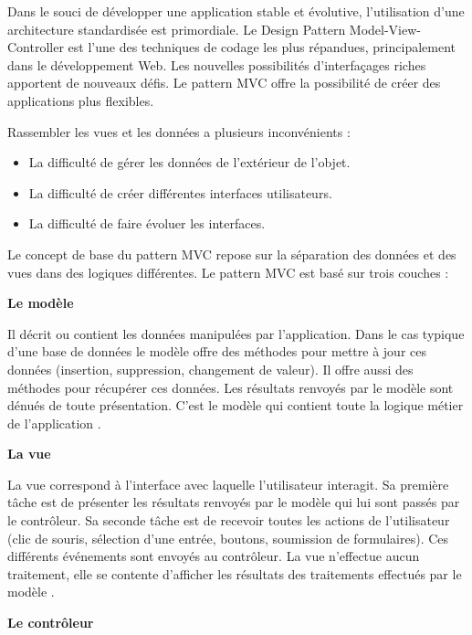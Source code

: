 \hspace{4mm}Dans le souci de développer une application stable et évolutive, l’utilisation d’une architecture standardisée est primordiale. Le Design Pattern Model-View-Controller est l'une des techniques de codage les plus répandues, principalement dans le développement Web. Les nouvelles possibilités d’interfaçages riches apportent de nouveaux défis. Le pattern MVC offre la possibilité de créer des applications plus flexibles. 
\par Rassembler les vues et les données a plusieurs inconvénients : 
\begin{itemize}
    \item 	La difficulté de gérer les données de l’extérieur de l’objet. 
    \item	La difficulté de créer différentes interfaces utilisateurs. 
    \item 	La difficulté de faire évoluer les interfaces. 
\end{itemize}
\par  Le concept de base du pattern MVC repose sur la séparation des données et des vues dans des logiques différentes. Le pattern MVC est basé sur trois couches : 
\par\textbf{	Le modèle }

\par Il décrit ou contient les données manipulées par l'application. Dans le cas typique d'une base de données le modèle offre des méthodes pour mettre à jour ces données (insertion, suppression, changement de valeur). Il offre aussi des méthodes pour récupérer ces données. Les résultats renvoyés par le modèle sont dénués de toute présentation. C'est le modèle qui contient toute la logique métier de l'application \cite{2}. 
\par\textbf{	La vue  }

\par La vue correspond à l'interface avec laquelle l'utilisateur interagit. Sa première tâche est de présenter les résultats renvoyés par le modèle qui lui sont passés par le contrôleur. Sa seconde tâche est de recevoir toutes les actions de l'utilisateur (clic de souris, sélection d'une entrée, boutons, soumission de formulaires). Ces différents événements sont envoyés au contrôleur. La vue n'effectue aucun traitement, elle se contente d'afficher les résultats des traitements effectués par le modèle \cite{2}. 
\newpage \par \textbf{	Le contrôleur   }

